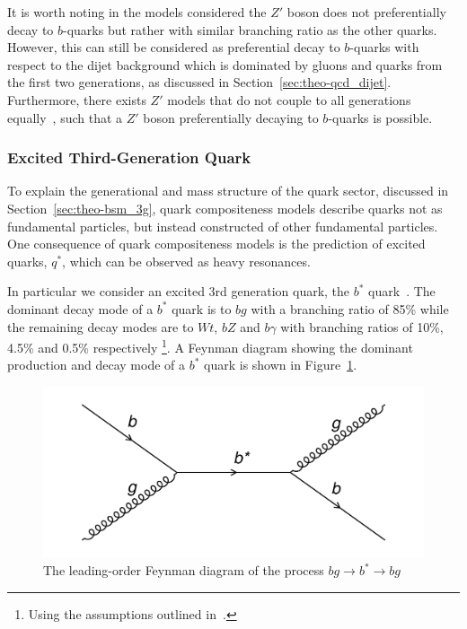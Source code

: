 It is worth noting in the models considered the $Z'$ boson does not preferentially decay to $b$-quarks but rather with similar branching ratio as the other quarks.
However, this can still be considered as preferential decay to $b$-quarks with respect to the dijet background
which is dominated by gluons and quarks from the first two generations, as discussed in Section~\ref{sec:theo-qcd_dijet}.
Furthermore, there exists $Z'$ models that do not couple to all generations equally~\cite{theo-bsm_zprime_3g},
such that a $Z'$ boson preferentially decaying to $b$-quarks is possible.

\subsubsection{Excited Third-Generation Quark}
\label{sec:theo-bsm_bstar}

To explain the generational and mass structure of the quark sector, discussed in Section~\ref{sec:theo-bsm_3g},
quark compositeness models describe quarks not as fundamental particles, but instead constructed of other fundamental particles.
One consequence of quark compositeness models is the prediction of excited quarks, $q^{*}$, which can be observed as heavy resonances.

In particular we consider an excited 3rd generation quark, the $b^{*}$ quark~\cite{theo-bsm_bstar}.
The dominant decay mode of a $b^{*}$ quark is to $bg$ with a branching ratio of 85\%
while the remaining decay modes are to $Wt$, $bZ$ and $b\gamma$ with branching ratios of 10\%, 4.5\% and 0.5\% respectively
\footnote{Using the assumptions outlined in~\cite{theo-bsm_bstar}.}.
A Feynman diagram showing the  dominant production and decay mode of a $b^*$ quark is shown in Figure~\ref{fig:theo-bsm_bstar}.

\begin{figure}[!hbt]
  \begin{center}
    \includegraphics[width=0.7\linewidth, angle=0]{figs/Theory/bsm_bstar.png}
  \end{center}
  \caption{The leading-order Feynman diagram of the process $bg \to b^* \to bg$}
  \label{fig:theo-bsm_bstar}
\end{figure}


